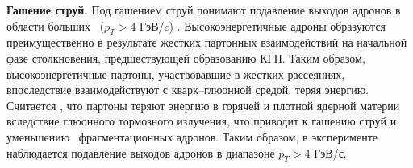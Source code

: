 \begin{comment}
	\begin{figure}[] 
		\center
		\includegraphics [width = 0,5\linewidth] {Intro/Strangeness_enhancement.png}
		\caption{Механизм образования странных кварков, основанный на модели термальной КХД.}
		\label{img:StrangenessEnhancement}  
	\end{figure}
\end{comment}
\begin{comment}
	\textbf{Динамика столкновения и уравнение состояния}
	Ожидается, что изучение коллективного движения образовавшихся адронов в конечном состоянии даст информацию о динамике столкновений тяжелых ионов. С гидродинамической точки зрения на столкновения,
	коллективное движение определяется градиентом давления сжатой ядерной материи на ранней стадии столкновения. В случае фазового перехода от порядковой ядерной к кварк-глюонной плазме ожидается соответствующее смягчение уравнения состояния за счет увеличения числа степеней свободы [4]. Таким образом, наблюдение за коллективным движением крайне важно для подтверждения гидродинамического описания динамики. Если фазовый переход первого рода, то уравнение состояния будет наиболее «мягким» при критической температуре Tc. Ожидается, что такое смягчение повлияет на динамическую эволюцию системы, поскольку внутреннее давление падает при Tc. Таким образом, наблюдение за функцией возбуждения поперечного коллективного потока может служить зондом для формирования КГП; падение функции возбуждения коллективного потока свидетельствует о пороговой энергии образования КГП.
\end{comment}

\textbf{Гашение струй.} 
Под гашением струй понимают подавление выходов адронов в области больших \pt \ ($p_T>4$ ГэВ/$c$) \cite{jet_quenching}. Высокоэнергетичные адроны образуются преимущественно в результате жестких партонных взаимодействий на начальной фазе столкновения, предшествующей образованию КГП. Таким образом, высокоэнергетичные партоны, участвовавшие в жестких рассеяниях, впоследствие взаимодействуют с кварк–глюонной средой, теряя энергию. Считается \cite{jet_quenching,InitialEnergyLoss}, что партоны теряют энергию в горячей и плотной ядерной материи вследствие глюонного тормозного излучения, что приводит к гашению струй и уменьшению \pt \ фрагментационных адронов.  Таким образом, в эксперименте наблюдается подавление выходов адронов в диапазоне $p_T > $4 ГэВ/с. 

